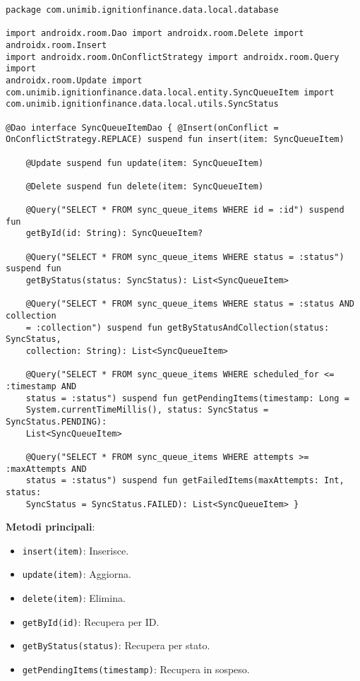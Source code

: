 \begin{lstlisting}[caption=SyncQueueItemDao.kt, label=lst:syncqueueitemdao, basicstyle=\ttfamily\scriptsize, breaklines=true, breakatwhitespace=true, tabsize=4]
package com.unimib.ignitionfinance.data.local.database

import androidx.room.Dao import androidx.room.Delete import androidx.room.Insert
import androidx.room.OnConflictStrategy import androidx.room.Query import
androidx.room.Update import
com.unimib.ignitionfinance.data.local.entity.SyncQueueItem import
com.unimib.ignitionfinance.data.local.utils.SyncStatus

@Dao interface SyncQueueItemDao { @Insert(onConflict =
OnConflictStrategy.REPLACE) suspend fun insert(item: SyncQueueItem)

    @Update suspend fun update(item: SyncQueueItem)

    @Delete suspend fun delete(item: SyncQueueItem)

    @Query("SELECT * FROM sync_queue_items WHERE id = :id") suspend fun
    getById(id: String): SyncQueueItem?

    @Query("SELECT * FROM sync_queue_items WHERE status = :status") suspend fun
    getByStatus(status: SyncStatus): List<SyncQueueItem>

    @Query("SELECT * FROM sync_queue_items WHERE status = :status AND collection
    = :collection") suspend fun getByStatusAndCollection(status: SyncStatus,
    collection: String): List<SyncQueueItem>

    @Query("SELECT * FROM sync_queue_items WHERE scheduled_for <= :timestamp AND
    status = :status") suspend fun getPendingItems(timestamp: Long =
    System.currentTimeMillis(), status: SyncStatus = SyncStatus.PENDING):
    List<SyncQueueItem>

    @Query("SELECT * FROM sync_queue_items WHERE attempts >= :maxAttempts AND
    status = :status") suspend fun getFailedItems(maxAttempts: Int, status:
    SyncStatus = SyncStatus.FAILED): List<SyncQueueItem> }
\end{lstlisting}

\textbf{Metodi principali}:
\begin{itemize}
    \item \texttt{insert(item)}: Inserisce.
    \item \texttt{update(item)}: Aggiorna.
    \item \texttt{delete(item)}: Elimina.
    \item \texttt{getById(id)}: Recupera per ID\@.
    \item \texttt{getByStatus(status)}: Recupera per stato.
    \item \texttt{getPendingItems(timestamp)}: Recupera in sospeso.
\end{itemize}

